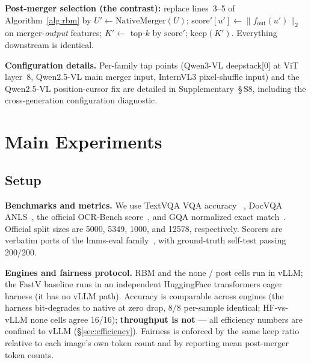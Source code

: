 \documentclass[sigconf,nonacm]{acmart}
\begin{document}
\noindent\textbf{Post-merger selection (the contrast):} replace lines~3--5 of
Algorithm~\ref{alg:rbm} by $U' \gets \mathrm{NativeMerger}(U)$;
$\mathrm{score}'[u'] \gets \| f_{\mathrm{out}}(u') \|_2$ on merger-\emph{output}
features; $K' \gets$ top-$k$ by $\mathrm{score}'$; $\mathrm{keep}(K')$.
Everything downstream is identical.

\textbf{Configuration details.} Per-family tap points (Qwen3-VL
deepstack[0] at ViT layer~8, Qwen2.5-VL main merger input, InternVL3
pixel-shuffle input) and
the Qwen2.5-VL position-cursor fix are detailed in Supplementary~\S\,S8,
including the cross-generation configuration diagnostic.

\section{Main Experiments}\label{sec:experiments}

\subsection{Setup}\label{sec:setup}

\textbf{Benchmarks and metrics.} We use TextVQA VQA accuracy
~\cite{singh2019textvqa}, DocVQA ANLS~\cite{mathew2021docvqa}, the official
OCR-Bench score~\cite{liu2024ocrbench}, and GQA normalized exact
match~\cite{hudson2019gqa}. Official split sizes are 5000, 5349, 1000, and
12578, respectively. Scorers
are verbatim ports of the lmms-eval family~\cite{zhang2024lmmseval}, with
ground-truth self-test passing 200/200.

\textbf{Engines and fairness protocol.} RBM and the none / post cells run in
vLLM; the FastV baseline runs in an independent HuggingFace transformers eager
harness (it has no vLLM path). Accuracy is comparable across engines (the harness
bit-degrades to native at zero drop, 8/8 per-sample identical; HF-vs-vLLM none
cells agree 16/16); \textbf{throughput is not} --- all efficiency numbers are
confined to vLLM (\S\ref{sec:efficiency}). Fairness is enforced by the same keep
ratio relative to each image's own token count and by reporting mean
post-merger token counts.
\end{document}
